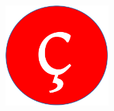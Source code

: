 \documentclass[11pt]{beamer}
\begin{document}



\begin{frame}
\begin{center}

\vspace{1cm}

\includegraphics[width=4cm]{logo}
\end{center}
\end{frame}
\end{document}
